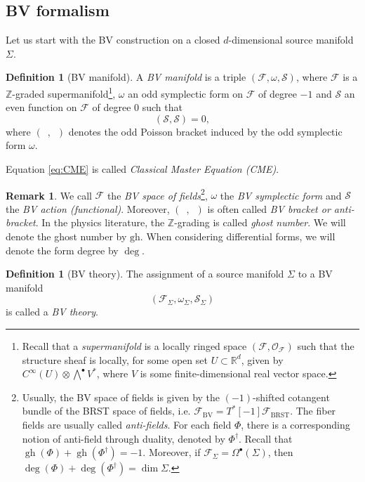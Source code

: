 \documentclass[11pt,colorinlistoftodos]{amsart}
\numberwithin{equation}{subsection}
\theoremstyle{plain}
\theoremstyle{definition}
\newtheorem{defn}[thm]{Definition}
\newtheorem{rem}[thm]{Remark}
\theoremstyle{remark}
\newcommand{\R}{\mathbb{R}}
\newcommand{\Z}{\mathbb{Z}}
\DeclareMathOperator{\gh}{gh}
\newcommand{\calS}{\mathcal{S}}
\newcommand{\calO}{\mathcal{O}}
\newcommand{\calF}{\mathcal{F}}
\begin{document}
\subsection{BV formalism}
\label{subsec:BV_formalism}
Let us start with the BV construction on a closed $d$-dimensional source manifold $\Sigma$. 
\begin{defn}[BV manifold]
A \emph{BV manifold} is a triple $(\calF,\omega,\calS)$, where  $\calF$ is a $\Z$-graded supermanifold\footnote{Recall that a \emph{supermanifold} is a locally ringed space $(\calF,\calO_\calF)$ such that the structure sheaf is locally, for some open set $U\subset \R^d$, given by $C^\infty(U)\otimes \bigwedge^\bullet V^*$, where $V$ is some finite-dimensional real vector space.}, $\omega$ an odd symplectic form on $\calF$ of degree $-1$ and $\calS$ an even function on $\calF$ of degree 0 such that 
\begin{equation}
\label{eq:CME}
(\calS,\calS)=0,
\end{equation}
where $(\enspace,\enspace)$ denotes the odd Poisson bracket induced by the odd symplectic form $\omega$.
\end{defn}
Equation \eqref{eq:CME} is called \emph{Classical Master Equation (CME)}.
\begin{rem}
We call $\calF$ the \emph{BV space of fields}\footnote{Usually, the BV space of fields is given by the $(-1)$-shifted cotangent bundle of the BRST space of fields, i.e. $\calF_{\mathrm{BV}}=T^*[-1]\calF_{\mathrm{BRST}}$. The fiber fields are usually called \emph{anti-fields}. For each field $\Phi$, there is a corresponding notion of anti-field through duality, denoted by $\Phi^\dagger$. Recall that $\gh(\Phi)+\gh(\Phi^\dagger)=-1$. Moreover, if $\calF_\Sigma=\Omega^\bullet(\Sigma)$, then $\deg(\Phi)+\deg(\Phi^\dagger)=\dim\Sigma$.}, $\omega$ the \emph{BV symplectic form} and $\calS$ the \emph{BV action (functional)}. Moreover, $(\enspace,\enspace)$ is often called \emph{BV bracket or anti-bracket}. In the physics literature, the $\Z$-grading is called \emph{ghost number}. We will denote the ghost number by $\mathrm{gh}$. When considering differential forms, we will denote the form degree by $\deg$. 
\end{rem}

\begin{defn}[BV theory]
The assignment of a source manifold $\Sigma$ to a BV manifold 
\[
(\calF_\Sigma,\omega_\Sigma,\calS_\Sigma)
\]
is called a \emph{BV theory}.
\end{defn}
\end{document}
